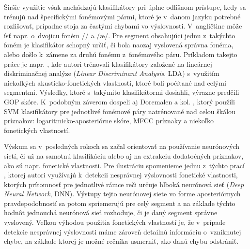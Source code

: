 Širšie využitie však nachádzajú klasifikátory pri úplne odlišnom prístupe, 
kedy sa trénujú nad špecifickými fonémovými pármi, ktoré je v~danom jazyku
potrebné rozlišovať, prípadne stoja za častými chybami vo výslovnosti. 
V~angličtine môže ísť napr. o~dvojicu foném /\textturnv/ a /\ae/. Pre segment obsahujúci jednu z~takýchto foném je klasifikátor schopný určiť, či bola naozaj vyslovená správna fonéma, alebo došlo k~zámene za druhú fonému z~fonémového páru. 
Príkladom takejto práce je napr. \cite{Strik2009}, kde autori trénovali klasifikátory založené na lineárnej diskriminačnej analýze (\textit{Linear Discriminant Analysis}, LDA)
s~využitím niekoľkých akusticko-fonetických vlastností, ktoré boli počítané nad celými segmentmi.
Výsledky, ktoré s~takýmito klasifikátormi dosiahli, výrazne predčili GOP skóre.
K~podobným záverom dospeli aj Doremalen a kol. \cite{Doremalen2009}, ktorý použili SVM klasifikátory pre jednotlivé fonémové páry natrénované nad celou škálou príznakov: logaritmicko-aposteriórne skóre, MFCC príznaky a niekoľko fonetických vlastností.




Výskum sa v~posledných rokoch sa začal orientovať na používanie neurónových sietí, či už na samotnú klasifikáciu alebo aj na extrakciu dodatočných príznakov, ako sú napr. fonetické vlastnosti. Pre ilustráciu spomenieme jednu z~týchto prací \cite{Arora2017}, ktorej autori využívajú k~detekcii nesprávnej výslovnosti fonetické vlastnosti, ktorých prítomnosť pre jednotlivé rámce reči určuje hlboká neurónová sieť (\textit{Deep Neural Network}, DNN). Výstupy tejto neurónovej siete vo forme aposteriórnych pravdepodobností sa potom spriemerujú pre celý segment a na základe týchto hodnôt jednouchá neurónová sieť rozhoduje, či je daný segment správne vyslovený. Veľkou výhodou použitia fonetických vlastností je, že v~prípade detekcie nesprávnej výslovnosti máme zároveň detailnú informáciu o~vzniknutej chybe, na základe ktorej je možné rečníka usmerniť, ako danú chybu odstrániť.

